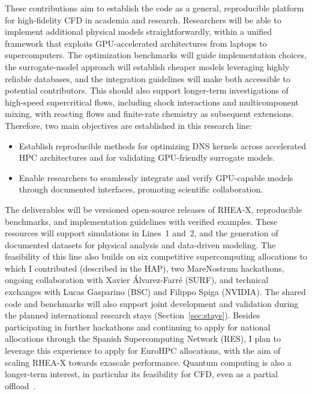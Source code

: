 \documentclass[11pt]{article}
\begin{document}
These contributions aim to establish the code as a general, reproducible platform for high-fidelity CFD in academia and research. Researchers will be able to implement additional physical models straightforwardly, within a unified framework that exploits GPU-accelerated architectures from laptops to supercomputers.
The optimization benchmarks will guide implementation choices, the surrogate-model approach will establish cheaper models leveraging highly reliable databases, and the integration guidelines will make both accessible to potential contributors. 
This should also support longer-term investigations of high-speed supercritical flows, including shock interactions and multicomponent mixing, with reacting flows and finite-rate chemistry as subsequent extensions.
Therefore, two main objectives are established in this research line:
\begin{itemize}
	\item[\textbf{O7.}] Establish reproducible methods for optimizing DNS kernels across accelerated HPC architectures and for validating GPU-friendly surrogate models.
	\item[\textbf{O8.}] Enable researchers to seamlessly integrate and verify GPU-capable models through documented interfaces, promoting scientific collaboration.
\end{itemize}

The deliverables will be versioned open-source releases of RHEA-X, reproducible benchmarks, and implementation guidelines with verified examples. 
These resources will support simulations in Lines~1 and~2, and the generation of documented datasets for physical analysis and data-driven modeling. 
The feasibility of this line also builds on six competitive supercomputing allocations to which I contributed (described in the HAP), two MareNostrum hackathons, ongoing collaboration with Xavier Álvarez-Farré (SURF), and technical exchanges with Lucas Gasparino (BSC) and Filippo Spiga (NVIDIA). 
The shared code and benchmarks will also support joint development and validation during the planned international research stays (Section~\ref{sec:stays}).
Besides participating in further hackathons and continuing to apply for national allocations through the Spanish Supercomputing Network (RES), I plan to leverage this experience to apply for EuroHPC allocations, with the aim of scaling RHEA-X towards exascale performance.
Quantum computing is also a longer-term interest, in particular its feasibility for CFD, even as a partial offload~\cite{Bharadwaj2023}.
\end{document}
